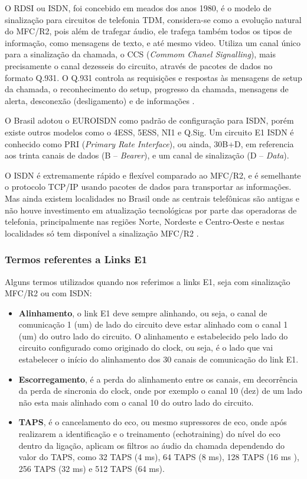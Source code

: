 O RDSI ou ISDN, foi concebido em meados dos anos 1980, é o modelo de sinalização para circuitos de telefonia TDM, considera-se como a evolução natural do MFC/R2, pois além de trafegar áudio, ele trafega também todos os tipos de informação, como mensagens de texto, e até mesmo video. Utiliza um canal único para a sinalização da chamada, o CCS (\textit{Commom Chanel Signalling}), mais precisamente o canal dezesseis do circuito, através de pacotes de dados no formato Q.931. O Q.931 controla as requisições e respostas às mensagens de setup da chamada, o reconhecimento do setup, progresso da chamada, mensagens de alerta, desconexão (desligamento) e de informações \cite{alexandrekeller2014}.

O Brasil adotou o EUROISDN como padrão de configuração para ISDN, porém existe outros modelos como o 4ESS, 5ESS, NI1 e Q.Sig. Um circuito E1 ISDN é conhecido como PRI (\textit{Primary Rate Interface}), ou ainda, 30B+D, em referencia aos trinta canais de dados (B – \textit{Bearer}), e um canal de sinalização (D – \textit{Data}).

O ISDN é extremamente rápido e flexível comparado ao MFC/R2, e é semelhante o protocolo TCP/IP usando pacotes de dados para transportar as informações. Mas ainda existem localidades no Brasil onde as centrais telefônicas são antigas e não houve investimento em atualização tecnológicas por parte das operadoras de telefonia, principalmente nas regiões Norte, Nordeste e Centro-Oeste e nestas localidades só tem disponível a sinalização MFC/R2 \cite{eduardotude2014}.

\subsubsection{Termos referentes a Links E1}
Alguns termos utilizados quando nos referimos a links E1, seja com sinalização MFC/R2 ou com ISDN: \cite{alexandrekeller2014}

\begin{itemize}
  \item \textbf{Alinhamento}, o link E1 deve sempre alinhando, ou seja, o canal de comunicação 1 (um) de lado do circuito deve estar alinhado com o canal 1 (um) do outro lado do circuito. O alinhamento e estabelecido pelo lado do circuito configurado como originado do clock, ou seja, é o lado que vai estabelecer o início do alinhamento dos 30 canais de comunicação do link E1.
  \item \textbf{Escorregamento}, é a perda do alinhamento entre os canais, em decorrência da perda de sincronia do clock, onde por exemplo o canal 10 (dez) de um lado não esta mais alinhado com o canal 10 do outro lado do circuito.
  \item \textbf{TAPS}, é o cancelamento do eco, ou mesmo supressores de eco, onde após realizarem a identificação e o treinamento (echotraining) do nível do eco dentro da ligação, aplicam os filtros ao áudio da chamada dependendo do valor do TAPS, como 32 TAPS (4 ms), 64 TAPS (8 ms), 128 TAPS (16 ms ), 256 TAPS (32 ms) e 512 TAPS (64 ms).
\end{itemize}